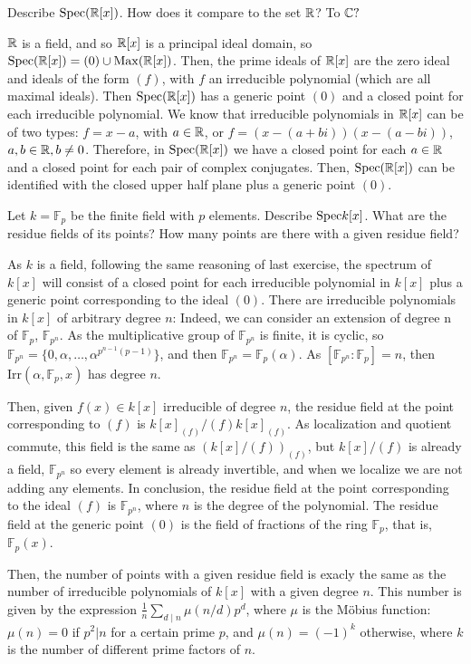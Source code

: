 \begin{ex}
	Describe $\mathrm{Spec}(\mathbb{R}[x])$. How does it compare to the set $\mathbb{R}$? To $\mathbb{C}?$
\end{ex}

\begin{sol}
	$\mathbb{R}$ is a field, and so $\mathbb{R}[x]$ is a principal ideal domain, so $\mathrm{Spec}(\mathbb{R}[x]) = (0) \cup \mathrm{Max}(\mathbb{R}[x])$. Then, the prime ideals of $\mathbb{R}[x]$ are the zero ideal and ideals of the form $(f)$, with $f$ an irreducible polynomial (which are all maximal ideals). Then $\mathrm{Spec}(\mathbb{R}[x])$ has a generic point $(0)$ and a closed point for each irreducible polynomial. We know that irreducible polynomials in $\mathbb{R}[x]$ can be of two types: $f = x-a$, with $a \in \mathbb{R}$, or $f = (x-(a+bi))(x-(a-bi))$, $a,b \in \mathbb{R}, b \neq 0$. Therefore, in $\mathrm{Spec}(\mathbb{R}[x])$ we have a closed point for each $a \in \mathbb{R}$ and a closed point for each pair of complex conjugates. Then, $\mathrm{Spec}(\mathbb{R}[x])$ can be identified with the closed upper half plane plus a generic point $(0)$.
\end{sol}

\begin{ex}
	Let $k = \mathbb{F}_p$ be the finite field with $p$ elements. Describe $\mathrm{Spec} k[x]$. What are the residue fields of its points? How many points are there with a given residue field?
\end{ex}

\begin{sol}
	As $k$ is a field, following the same reasoning of last exercise, the spectrum of $k[x]$ will consist of a closed point for each irreducible polynomial in $k[x]$ plus a generic point corresponding to the ideal $(0)$. There are irreducible polynomials in $k[x]$ of arbitrary degree $n$: Indeed, we can consider an extension of degree n of $\mathbb{F}_p$, $\mathbb{F}_{p^n}$. As the multiplicative group of $\mathbb{F}_{p^n}$ is finite, it is cyclic, so $\mathbb{F}_{p^n} = \{0, \alpha, \dots, \alpha^{p^{n-1}(p-1)} \}$, and then $\mathbb{F}_{p^n} = \mathbb{F}_p(\alpha)$. As $[\mathbb{F}_{p^n} : \mathbb{F}_p] = n$, then $\text{Irr}(\alpha, \mathbb{F}_p, x)$ has degree $n$.

	Then, given $f(x) \in k[x]$ irreducible of degree $n$, the residue field at the point corresponding to $(f)$ is $k[x]_{(f)} / (f)k[x]_{(f)}$. As localization and quotient commute, this field is the same as $(k[x]/(f))_{(f)}$, but $k[x]/(f)$ is already a field, $\mathbb{F}_{p^n}$ so every element is already invertible, and when we localize we are not adding any elements. In conclusion, the residue field at the point corresponding to the ideal $(f)$ is $\mathbb{F}_{p^n}$, where $n$ is the degree of the polynomial. The residue field at the generic point $(0)$ is the field of fractions of the ring $\mathbb{F}_p$, that is, $\mathbb{F}_p(x)$. 

	Then, the number of points with a given residue field is exacly the same as the number of irreducible polynomials of $k[x]$ with a given degree $n$. This number is given by the expression $\frac{1}{n} \sum_{d \mid n} \mu(n/d) p^d$, where $\mu$ is the Möbius function: $\mu(n) = 0$ if $p^2 | n$ for a certain prime $p$, and $\mu(n) = (-1)^k$ otherwise, where $k$ is the number of different prime factors of $n$.
\end{sol}

